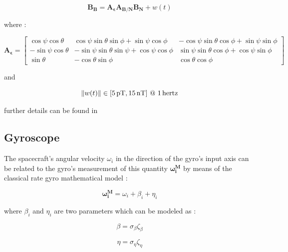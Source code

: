 \documentclass[11pt,a4paper]{report}
\begin{document}
\begin{equation}
 \mathbf{B_{B}} = \mathbf{A_{\epsilon}} \mathbf{A_{B/N}} \mathbf{B_{N}} + w(t)
\end{equation}

where : 

\begin{equation*}
 \mathbf{A_{\epsilon}} =
                                \begin{bmatrix}
                                    \cos\psi\cos\theta & \cos\psi\sin\theta\sin\phi + \sin\psi\cos\phi & -\cos\psi\sin\theta\cos\phi + \sin\psi\sin\phi \\
                                    -\sin\psi\cos\theta & -\sin\psi\sin\theta\sin\psi + \cos\psi\cos\phi & \sin\psi\sin\theta\cos\phi + \cos\psi\sin\phi \\
                                    \sin\theta & -\cos\theta\sin\phi & \cos\theta\cos\phi
                                \end{bmatrix}
\end{equation*}
 
and 

\begin{equation*}
 \norm{w(t)} \in [\SI{5}{\pico\tesla},\SI{15}{\nano\tesla}] \ @ \ \SI{1}{hertz}
\end{equation*}

further details can be found in \cite{notes:bigss}

\subsection{Gyroscope}
The spacecraft's angular velocity $\omega_{i}$ in the direction of the gyro's input axis can be related to the gyro's measurement of this quantity $\mathbf{\omega_{i}^{M}}$ by means of the classical rate gyro mathematical model : 

\begin{equation}
 \mathbf{\omega_{i}^{M}} = \omega_{i} + \beta_{i} + \eta_{i}
\end{equation}

where  $\beta_{i}$ and $\eta_{i}$ are two parameters which can be modeled as :

\begin{equation*}
 \beta = \sigma_{\beta} \zeta_{\beta}
\end{equation*}

\begin{equation*}
 \eta = \sigma_{\eta} \zeta_{\eta}
\end{equation*}
\end{document}
